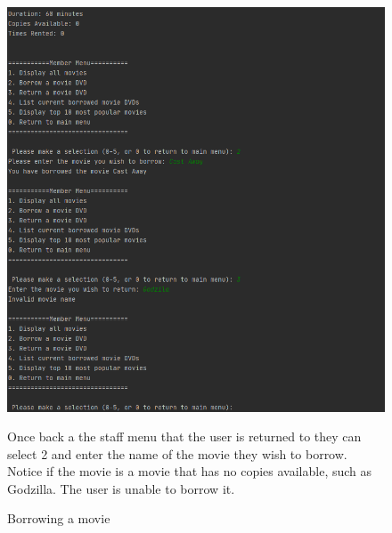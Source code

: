 \documentclass[a4paper,12pt]{article}
\begin{document}
\begin{figure}[!htb]
\centering
\includegraphics[width=1\textwidth]{8}
\caption{Borrowing a movie}
\medskip
\small
Once back a the staff menu that the user is returned to they can select 2 and enter the name of the movie they wish to borrow. Notice if the movie is a movie that has no copies available, such as Godzilla. The user is unable to borrow it.
\end{figure}
\end{document}

